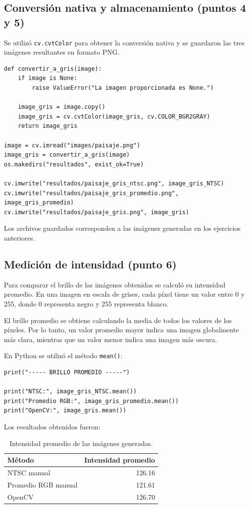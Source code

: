 \documentclass[11pt,a4paper]{article}
\begin{document}
\subsection{Conversi\'on nativa y almacenamiento (puntos 4 y 5)}
Se utiliz\'o \texttt{cv.cvtColor} para obtener la conversi\'on nativa y se
guardaron las tres im\'agenes resultantes en formato PNG.
\begin{lstlisting}
def convertir_a_gris(image):
    if image is None:
        raise ValueError("La imagen proporcionada es None.")

    image_gris = image.copy()
    image_gris = cv.cvtColor(image_gris, cv.COLOR_BGR2GRAY)
    return image_gris

image = cv.imread("images/paisaje.png")
image_gris = convertir_a_gris(image)
os.makedirs("resultados", exist_ok=True)

cv.imwrite("resultados/paisaje_gris_ntsc.png", image_gris_NTSC)
cv.imwrite("resultados/paisaje_gris_promedio.png", image_gris_promedio)
cv.imwrite("resultados/paisaje_gris.png", image_gris)
\end{lstlisting}
Los archivos guardados corresponden a las im\'agenes generadas en los
ejercicios anteriores.

\subsection{Medición de intensidad (punto 6)}

Para comparar el brillo de las imágenes obtenidas se calculó su intensidad
promedio. En una imagen en escala de grises, cada píxel tiene un valor entre
0 y 255, donde 0 representa negro y 255 representa blanco.

El brillo promedio se obtiene calculando la media de todos los valores de
los píxeles. Por lo tanto, un valor promedio mayor indica una imagen
globalmente más clara, mientras que un valor menor indica una imagen más
oscura.

En Python se utilizó el método \texttt{mean()}:

\begin{lstlisting}
print("----- BRILLO PROMEDIO -----")

print("NTSC:", image_gris_NTSC.mean())
print("Promedio RGB:", image_gris_promedio.mean())
print("OpenCV:", image_gris.mean())
\end{lstlisting}

Los resultados obtenidos fueron:

\begin{table}[htbp]
\centering
\caption{Intensidad promedio de las imágenes generadas.}
\begin{tabular}{lr}
\toprule
Método & Intensidad promedio\\
\midrule
NTSC manual & 126.16\\
Promedio RGB manual & 121.61\\
OpenCV & 126.70\\
\bottomrule
\end{tabular}
\end{table}
\end{document}
